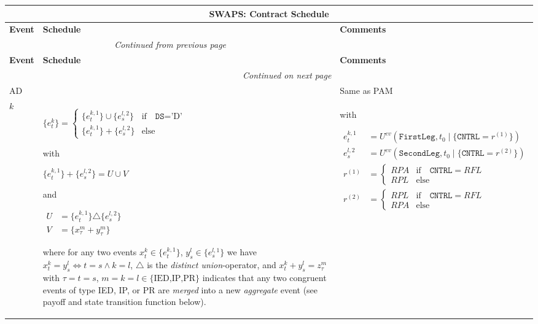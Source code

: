 \documentclass[9pt,oneside]{amsart}
\newenvironment{schedule}[1]{
	\begin{longtable}[H]{| p{0.05\textwidth} | p{0.5\textwidth} |  p{0.4\textwidth} |}
	\multicolumn{3}{c}{\textbf{#1: Contract Schedule}}\\
	\hline
	\textbf{Event} & \textbf{Schedule} & \textbf{Comments} \\
	\hline
	\endfirsthead
	\multicolumn{2}{c}{\textit{Continued from previous page}} \\
	\hline
	\textbf{Event} & \textbf{Schedule} & \textbf{Comments} \\
	\hline
	\endhead
	\hline \multicolumn{2}{r}{\textit{Continued on next page}} \\
	\endfoot
	\hline
	\endlastfoot
}{%
	\hline
	\end{longtable}
}
\newcommand{\attr}[1]{\texttt{#1}}
\newcommand{\cldev}[3]{U^{ev}(\texttt{#1},#2 \mid\{#3\})}
\begin{document}
\begin{schedule}{SWAPS}
	AD & & Same as PAM \\
	\hline
	$k$ & $\{e_t^k\} = \begin{cases}
				\{e_t^{k,1}\}\cup \{e_s^{l,2}\} & \text{if}\quad \attr{DS}=\text{'D'} \\
				\{e_t^{k,1}\} + \{e_s^{l,2}\} & \text{else} \end{cases}$ \par
	with\par
	$\{e_t^{k,1}\}+\{e_s^{l,2}\} = U \cup V$\par
	and\par
	{$\begin{aligned}
		U &= \{e_t^{k,1}\} \triangle \{e_s^{l,2}\}\\
		V &= \{x_\tau^m+y_\tau^m\}
	\end{aligned}$} \par
	where for any two events $x_t^k\in\{e_t^{k,1}\}$, $y_s^l\in\{e_s^{l,1}\}$ we have $x_t^k=y_s^l \iff t=s \land k=l$, $\triangle$ is the \textit{distinct union}-operator, and $x_t^k+y_s^l=z_\tau^m$ with $\tau=t=s$, $m=k=l\in\{\text{IED,IP,PR}\}$ indicates that any two congruent events of type IED, IP, or PR are \textit{merged} into a new \textit{aggregate} event (see payoff and state transition function below).
		& with\par
			{$\begin{aligned}
				e_t^{k,1} &= \cldev{FirstLeg}{t_0}{\attr{CNTRL}=r^{(1)}} \\
				e_s^{l,2} &= \cldev{SecondLeg}{t_0}{\attr{CNTRL}=r^{(2)}} \\
				r^{(1)} &= \begin{cases} RPA & \text{if}\quad \attr{CNTRL}=RFL \\
					RPL & \text{else} \end{cases} \\
				r^{(2)} &= \begin{cases} RPL & \text{if}\quad \attr{CNTRL}=RFL \\
					RPA & \text{else} \end{cases}
			\end{aligned}$} \\
\end{schedule}





\end{document}
